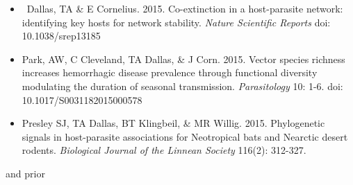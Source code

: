 \documentclass[]{CV}
\begin{document}
\begin{itemize}

\item \OA \ {\mefont Dallas, TA} \& E Cornelius. 2015. Co-extinction in a host-parasite network: identifying key hosts for network stability. \textit{Nature Scientific Reports} doi: 10.1038/srep13185

\item Park, AW, C Cleveland, {\mefont TA Dallas}, \& J Corn. 2015. Vector species richness increases hemorrhagic disease prevalence through functional diversity modulating the duration of seasonal transmission. \textit{Parasitology} 10: 1-6. doi: 10.1017/S0031182015000578

\item Presley SJ, {\mefont TA Dallas}, BT Klingbeil, \& MR Willig. 2015. Phylogenetic signals in host-parasite associations for Neotropical bats and Nearctic desert rodents. \textit{Biological Journal of the Linnean Society} 116(2): 312-327. 

\end{itemize}



{ and prior}
\end{document}
